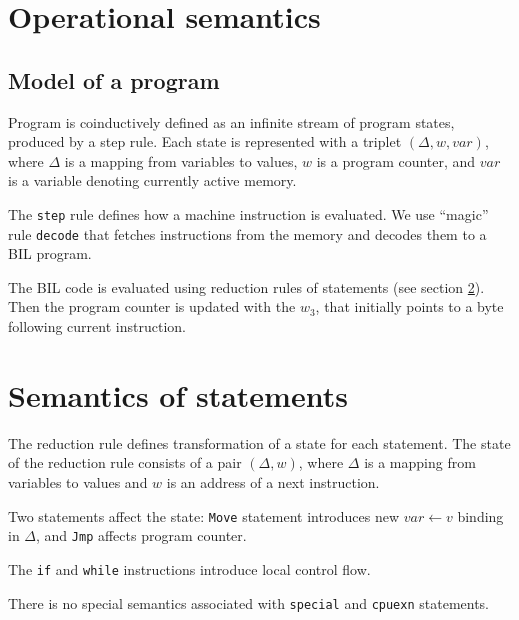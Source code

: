 \documentclass[11pt]{article}
\begin{document}
\ottdefnstypingXXstmt

\ottdefnstypingXXexp

\ottdefnstypingXXgamma

\clearpage


\section{Operational semantics}

\subsection{Model of a program}

Program is coinductively defined as an infinite stream of program
states, produced by a step rule. Each state is represented with a
triplet $(\Delta, w, var)$, where $\Delta$ is a mapping from variables
to values, $w$ is a program counter, and $var$ is a variable
denoting currently active memory.

The \verb|step| rule defines how a machine instruction is
evaluated. We use ``magic'' rule \verb|decode| that fetches
instructions from the memory and decodes them to a BIL program.

The BIL code is evaluated using reduction rules of statements (see
section \ref{sec:sema:stmt}). Then the program counter is updated with
the $w_3$, that initially points to a byte following current instruction.

\ottdefnsprogram

\section{Semantics of statements}
\label{sec:sema:stmt}

The reduction rule defines transformation of a state for each
statement. The state of the reduction rule consists of a pair
$(\Delta,w)$, where $\Delta$ is a mapping from variables to values and
$w$ is an address of a next instruction.

Two statements affect the state: \verb|Move| statement introduces new
$var \leftarrow v$ binding in $\Delta$, and \verb|Jmp| affects
program counter.

The \verb|if| and \verb|while| instructions introduce local control
flow.

There is no special semantics associated with \verb|special| and
\verb|cpuexn| statements.

\ottdefnsreduceXXstmt
\end{document}
